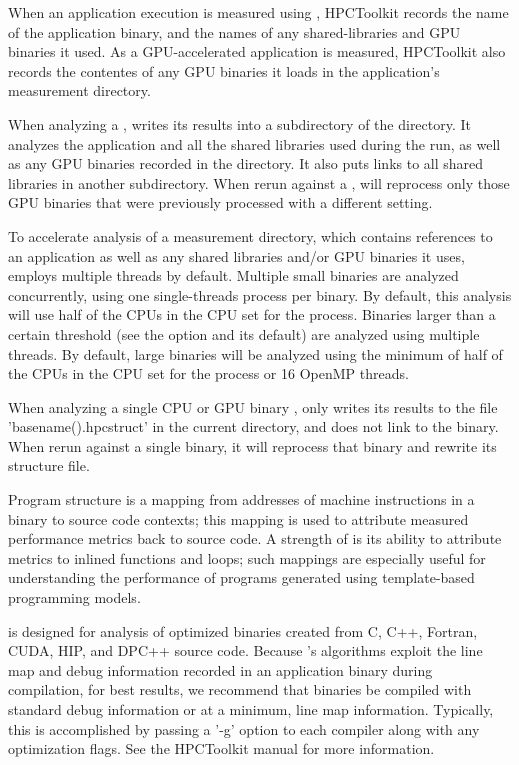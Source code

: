 \documentclass[english]{article}
\begin{document}
When an application execution is measured using , HPCToolkit records the name of the application binary,
and the names of any shared-libraries and GPU binaries it used. As a GPU-accelerated application is measured,
HPCToolkit also records the contentes of any GPU binaries it loads in the application's measurement directory.

When analyzing a ,   writes its results into a subdirectory of the directory.
It analyzes the application and all the shared libraries used during the run, as well as any
GPU binaries recorded in the directory.  It also puts links to all shared libraries in another subdirectory.
When rerun against a ,   will reprocess only those GPU binaries that were
previously processed with a different  setting.

To accelerate analysis of a measurement directory, which contains
references to an application as well as any shared libraries
and/or GPU binaries it uses,  employs multiple threads by
default. Multiple small binaries are analyzed concurrently, using one single-threads
process per binary. By default, this analysis will use half of the
CPUs in the CPU set for the process. Binaries larger than a certain
threshold (see the  option and its default) are analyzed using
multiple threads. By default, large binaries will be analyzed using
the minimum of half of the CPUs in the CPU set for the process or 16 OpenMP threads.

When analyzing a single CPU or GPU binary ,  only writes its results to the file
'basename().hpcstruct' in the current directory, and does not link to the binary.
When rerun against a single binary, it will reprocess that binary and rewrite
its structure file.

Program structure is a mapping from addresses of machine instructions
in a binary to source code contexts; this mapping is used to attribute
measured performance metrics back to source code. A strength of
 is its ability to attribute metrics to inlined functions
and loops; such mappings are especially useful for understanding the
performance of programs generated using template-based programming
models.

 is designed for analysis of optimized binaries created from
C, C++, Fortran, CUDA, HIP, and DPC++ source code. Because 's
algorithms exploit the line map and debug information recorded in an
application binary during compilation, for best results, we recommend that
binaries be compiled with standard debug information or at a minimum,
line map information. Typically, this is accomplished by passing a '-g'
option to each compiler along with any optimization flags. See the
HPCToolkit manual for more information.
\end{document}
